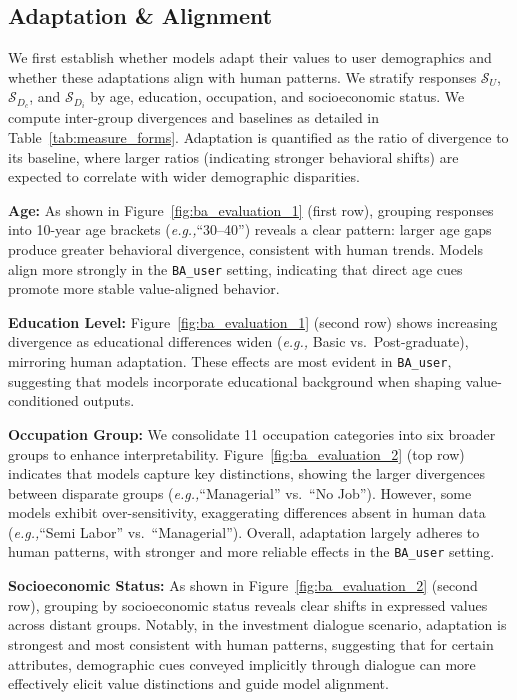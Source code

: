 \documentclass[final]{clv2025}
\newcommand{\paratitle}[1]{\smallskip\noindent\textbf{#1}}
\newcommand{\eg}{\textit{e.g.,}\xspace}
\begin{document}
\subsection{Adaptation \& Alignment}

We first establish whether models adapt their values to user demographics and whether these adaptations align with human patterns. We stratify responses $\mathcal{S}_U$, $\mathcal{S}_{D_c}$, and $\mathcal{S}_{D_i}$ by age, education, occupation, and socioeconomic status. We compute inter-group divergences and baselines as detailed in Table~\ref{tab:measure_forms}. Adaptation is quantified as the ratio of divergence to its baseline, where larger ratios (indicating stronger behavioral shifts) are expected to correlate with wider demographic disparities.

\paratitle{Age:} As shown in Figure~\ref{fig:ba_evaluation_1} (first row), grouping responses into 10-year age brackets (\eg ``30--40'') reveals a clear pattern: larger age gaps produce greater behavioral divergence, consistent with human trends. Models align more strongly in the \texttt{BA\_user} setting, indicating that direct age cues promote more stable value-aligned behavior.

\paratitle{Education Level:} Figure~\ref{fig:ba_evaluation_1} (second row) shows increasing divergence as educational differences widen (\eg Basic vs.\ Post-graduate), mirroring human adaptation. These effects are most evident in \texttt{BA\_user}, suggesting that models incorporate educational background when shaping value-conditioned outputs.

\paratitle{Occupation Group:} We consolidate 11 occupation categories into six broader groups to enhance interpretability. Figure~\ref{fig:ba_evaluation_2} (top row) indicates that models capture key distinctions, showing the larger divergences between disparate groups (\eg ``Managerial'' vs.\ ``No Job''). However, some models exhibit over-sensitivity, exaggerating differences absent in human data (\eg ``Semi Labor'' vs.\ ``Managerial''). Overall, adaptation largely adheres to human patterns, with stronger and more reliable effects in the \texttt{BA\_user} setting.

\paratitle{Socioeconomic Status:} As shown in Figure~\ref{fig:ba_evaluation_2} (second row), grouping by socioeconomic status reveals clear shifts in expressed values across distant groups. Notably, in the investment dialogue scenario, adaptation is strongest and most consistent with human patterns, suggesting that for certain attributes, demographic cues conveyed implicitly through dialogue can more effectively elicit value distinctions and guide model alignment.
\end{document}
